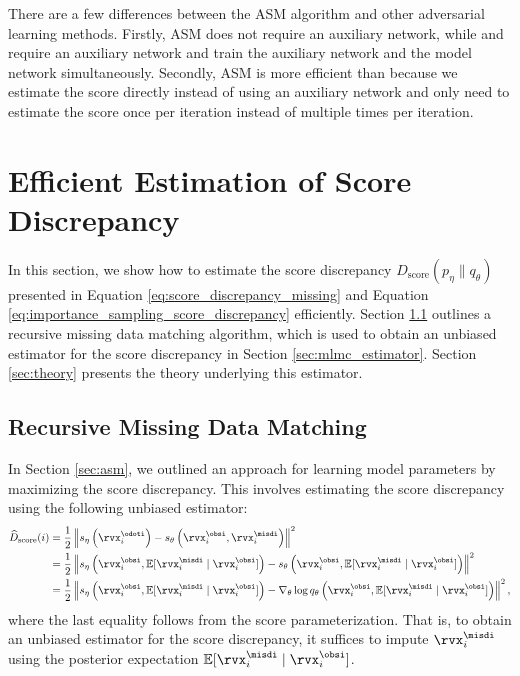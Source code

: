 There are a few differences between the ASM algorithm and other adversarial learning methods. Firstly, ASM does not require an auxiliary network, while \citet{Li2019a} and \citet{Li2017a} require an auxiliary network and train the auxiliary network and the model network simultaneously. Secondly, ASM is more efficient than \citet{Binkowski2018} because we estimate the score directly instead of using an auxiliary network and only need to estimate the score once per iteration instead of multiple times per iteration.


\section{Efficient Estimation of Score Discrepancy}

\label{sec:efficient_estimator}
In this section, we show how to estimate the score discrepancy $D_{\text{score}}(p_{\eta} \| q_{\theta})$ presented in Equation \eqref{eq:score_discrepancy_missing} and Equation \eqref{eq:importance_sampling_score_discrepancy} efficiently. Section \ref{sec:recursive_matching} outlines a recursive missing data matching algorithm, which is used to obtain an unbiased estimator for the score discrepancy in Section \ref{sec:mlmc_estimator}. Section \ref{sec:theory} presents the theory underlying this estimator.

\subsection{Recursive Missing Data Matching}
\label{sec:recursive_matching}
In Section \ref{sec:asm}, we outlined an approach for learning model parameters by maximizing the score discrepancy. This involves estimating the score discrepancy using the following unbiased estimator:
\begin{align}
	\widehat{D}_{\text{score}}(i) & = \frac{1}{2} \left\| s_{\eta} \left( \rvx_{i}^{\odoti} \right) - s_{\theta} \left( \rvx_{i}^{\obsi}, \rvx_{i}^{\misdi} \right) \right\|^{2} \notag \\
	&= \frac{1}{2} \left\| s_{\eta} \left( \rvx_{i}^{\obsi}, \mathbb{E}[\rvx_{i}^{\misdi} \mid \rvx_{i}^{\obsi} ] \right) - s_{\theta} \left( \rvx_{i}^{\obsi}, \mathbb{E}[\rvx_{i}^{\misdi} \mid \rvx_{i}^{\obsi} ] \right) \right\|^{2} \notag \\
	&= \frac{1}{2} \left\| s_{\eta} \left( \rvx_{i}^{\obsi}, \mathbb{E}[\rvx_{i}^{\misdi} \mid \rvx_{i}^{\obsi} ] \right) - \nabla_{\theta} \log q_{\theta} \left( \rvx_{i}^{\obsi}, \mathbb{E}[\rvx_{i}^{\misdi} \mid \rvx_{i}^{\obsi} ] \right) \right\|^{2}, \label{eq:recursive_matching}
\end{align}
where the last equality follows from the score parameterization.
That is, to obtain an unbiased estimator for the score discrepancy, it suffices to impute $\rvx_{i}^{\misdi}$ using the posterior expectation $\mathbb{E}[\rvx_{i}^{\misdi} \mid \rvx_{i}^{\obsi} ]$.

